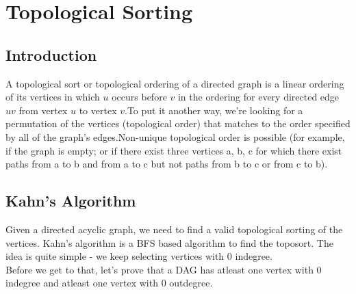 \chapter{Topological Sorting}

\section{Introduction}
A topological sort or topological ordering of a directed graph is a linear ordering of its vertices in which $u$ occurs before $v$ in the ordering for every directed edge $uv$ from vertex $u$ to vertex $v$.To put it another way, we're looking for a permutation of the vertices (topological order) that matches to the order specified by all of the graph's edges.Non-unique topological order is possible (for example, if the graph is empty; or if there exist three vertices a, b, c for which there exist paths from a to b and from a to c but not paths from b to c or from c to b).

\section{Kahn's Algorithm}
Given a directed acyclic graph, we need to find a valid topological sorting of the vertices. Kahn's algorithm is a BFS based algorithm to find the toposort. The idea is quite simple - we keep selecting vertices with $0$ indegree.\\
Before we get to that, let's prove that a DAG has atleast one vertex with 0 indegree and atleast one vertex with 0 outdegree. 
